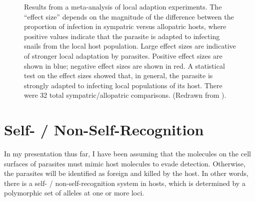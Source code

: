\documentclass[
  letterpaper,
]{book}
\begin{document}
\begin{figure}


\caption[Results from a meta-analysis of local adaption
experiments]{\label{fig-4.5}Results from a meta-analysis of local
adaption experiments. The ``effect size'' depends on the magnitude of
the difference between the proportion of infection in sympatric versus
allopatric hosts, where positive values indicate that the parasite is
adapted to infecting snails from the local host population. Large effect
sizes are indicative of stronger local adaptation by parasites. Positive
effect sizes are shown in blue; negative effect sizes are shown in red.
A statistical test on the effect sizes showed that, in general, the
parasite is strongly adapted to infecting local populations of its host.
There were 32 total sympatric/allopatric comparisons. (Redrawn from
).}

\end{figure}%

\section{Self- / Non-Self-Recognition}\label{self--non-self-recognition}

In my presentation thus far, I have been assuming that the molecules on
the cell surfaces of parasites must mimic host molecules to evade
detection. Otherwise, the parasites will be identified as foreign and
killed by the host. In other words, there is a self- /
non-self-recognition system in hosts, which is determined by a
polymorphic set of alleles at one or more loci.
\end{document}
